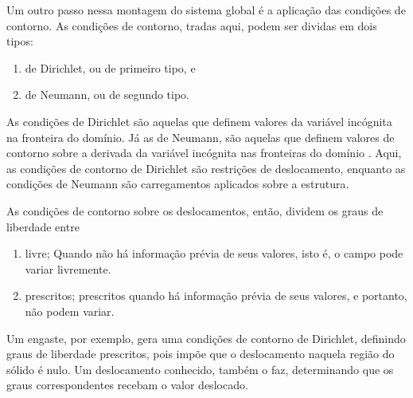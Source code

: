 Um outro passo nessa montagem do sistema global é a aplicação das condições de contorno. As condições de contorno, tradas aqui, podem ser dividas em dois tipos: 

\begin{enumerate}
    \item de Dirichlet, ou de primeiro tipo, e
    \item de Neumann, ou de segundo tipo.
\end{enumerate}

 As condições de Dirichlet são aquelas que definem valores da variável incógnita na fronteira do domínio. Já as de Neumann, são aquelas que definem valores de contorno sobre a derivada da variável incógnita nas fronteiras do domínio \cite{sinan}. Aqui, as condições de contorno de Dirichlet são restrições de deslocamento, enquanto as condições de Neumann são carregamentos aplicados sobre a estrutura.
 
As condições de contorno sobre os deslocamentos, então, dividem os graus de liberdade entre 

\begin{enumerate}
    \item livre;
    Quando não há informação prévia de seus valores, isto é, o campo pode variar livremente.
    \item prescritos;
    prescritos quando há informação prévia de seus valores, e portanto, não podem variar.
    \cite{LOGAN}
\end{enumerate}

Um engaste, por exemplo, gera uma condições de contorno de Dirichlet, definindo graus de liberdade prescritos, pois impõe que o deslocamento naquela região do sólido é nulo. Um deslocamento conhecido, também o faz, determinando que os graus correspondentes recebam o valor deslocado.

